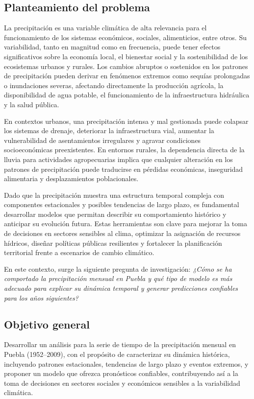 \documentclass[12pt,letterpaper]{article}   %
\begin{document}
\subsection{Planteamiento del problema}
La precipitación es una variable climática de alta relevancia para el funcionamiento de los sistemas económicos, sociales, alimenticios, entre otros. Su variabilidad, tanto en magnitud como en frecuencia, puede tener efectos significativos sobre la economía local, el bienestar social y la sostenibilidad de los ecosistemas urbanos y rurales. Los cambios abruptos o sostenidos en los patrones de precipitación pueden derivar en fenómenos extremos como sequías prolongadas o inundaciones severas, afectando directamente la producción agrícola, la disponibilidad de agua potable, el funcionamiento de la infraestructura hidráulica y la salud pública.

En contextos urbanos, una precipitación intensa y mal gestionada puede colapsar los sistemas de drenaje, deteriorar la infraestructura vial, aumentar la vulnerabilidad de asentamientos irregulares y agravar condiciones socioeconómicas preexistentes. En entornos rurales, la dependencia directa de la lluvia para actividades agropecuarias implica que cualquier alteración en los patrones de precipitación puede traducirse en pérdidas económicas, inseguridad alimentaria y desplazamientos poblacionales.

Dado que la precipitación muestra una estructura temporal compleja con componentes estacionales y posibles tendencias de largo plazo, es fundamental desarrollar modelos que permitan describir su comportamiento histórico y anticipar su evolución futura. Estas herramientas son clave para mejorar la toma de decisiones en sectores sensibles al clima, optimizar la asignación de recursos hídricos, diseñar políticas públicas resilientes y fortalecer la planificación territorial frente a escenarios de cambio climático.

En este contexto, surge la siguiente pregunta de investigación:
\textit{¿Cómo se ha comportado la precipitación mensual en Puebla y qué tipo de modelo es más adecuado para explicar su dinámica temporal y generar predicciones confiables para los años siguientes?}



\subsection{Objetivo general}
Desarrollar un análisis para la serie de tiempo de la precipitación mensual en Puebla (1952–2009), con el propósito de caracterizar su dinámica histórica, incluyendo patrones estacionales, tendencias de largo plazo y eventos extremos, y proponer un modelo que ofrezca pronósticos confiables, contribuyendo así a la toma de decisiones en sectores sociales y económicos sensibles a la variabilidad climática.
\end{document}
